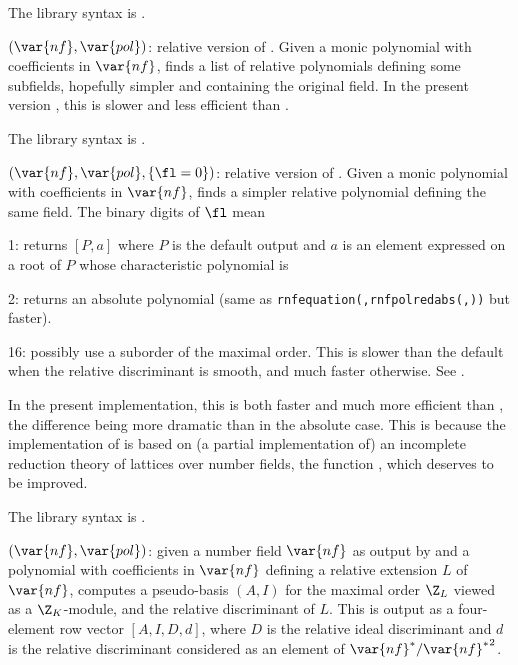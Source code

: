 The library syntax is .

$(\var{nf},\var{pol})$: \label{se:rnfpolred}relative version of .
Given a monic polynomial  with coefficients in $\var{nf}$, finds a
list of relative polynomials defining some subfields, hopefully simpler and
containing the original field. In the present version \vers, this is slower
and less efficient than .

The library syntax is .

$(\var{nf},\var{pol},\{\fl=0\})$: \label{se:rnfpolredabs}relative version of
. Given a monic polynomial  with coefficients in
$\var{nf}$, finds a simpler relative polynomial defining the same field. The
binary digits of $\fl$ mean

1: returns $[P,a]$ where $P$ is the default output and $a$ is an
element expressed on a root of $P$ whose characteristic polynomial is

2: returns an absolute polynomial (same as
{\tt rnfequation(,rnfpolredabs(,))}
but faster).

16: possibly use a suborder of the maximal order. This is slower than the
default when the relative discriminant is smooth, and much faster otherwise.
See .

 In the present implementation, this is both faster and
much more efficient than , the difference being more
dramatic than in the absolute case. This is because the implementation of
 is based on (a partial implementation of) an incomplete
reduction theory of lattices over number fields, the function
, which deserves to be improved.

The library syntax is .

$(\var{nf},\var{pol})$: \label{se:rnfpseudobasis}given a number field
$\var{nf}$ as output by  and a polynomial  with
coefficients in $\var{nf}$ defining a relative extension $L$ of $\var{nf}$,
computes a pseudo-basis $(A,I)$ for the maximal order $\Z_L$ viewed as a
$\Z_K$-module, and the relative discriminant of $L$. This is output as a
four-element row vector $[A,I,D,d]$, where $D$ is the relative ideal
discriminant and $d$ is the relative discriminant considered as an element of
$\var{nf}^*/{\var{nf}^*}^2$.

